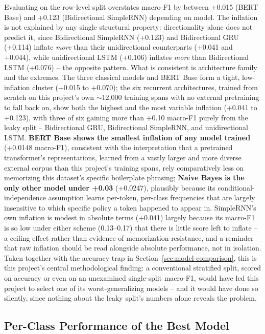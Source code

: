 \documentclass[11pt]{acl}
\begin{document}
Evaluating on the row-level split overstates macro-F1 by between +0.015 (BERT Base) and
+0.123 (Bidirectional SimpleRNN) depending on model. The inflation is not explained by
any single structural property: directionality alone does not predict it, since
Bidirectional SimpleRNN (+0.123) and Bidirectional GRU (+0.114) inflate \emph{more} than
their unidirectional counterparts (+0.041 and +0.044), while unidirectional LSTM
(+0.106) inflates \emph{more} than Bidirectional LSTM (+0.076) -- the opposite pattern.
What is consistent is architecture family and the extremes. The three classical models
and BERT Base form a tight, low-inflation cluster (+0.015 to +0.070); the six recurrent
architectures, trained from scratch on this project's own ${\sim}$12,000 training spans
with no external pretraining to fall back on, show both the highest and the most
variable inflation (+0.041 to +0.123), with three of six gaining more than +0.10
macro-F1 purely from the leaky split -- Bidirectional GRU, Bidirectional SimpleRNN, and
unidirectional LSTM. \textbf{BERT Base shows the smallest inflation of any model
trained} (+0.0148 macro-F1), consistent with the interpretation that a pretrained
transformer's representations, learned from a vastly larger and more diverse external
corpus than this project's training spans, rely comparatively less on memorizing this
dataset's specific boilerplate phrasing; \textbf{Naive Bayes is the only other model
under +0.03} (+0.0247), plausibly because its conditional-independence assumption
learns per-token, per-class frequencies that are largely insensitive to which specific
policy a token happened to appear in. SimpleRNN's own inflation is modest in absolute
terms (+0.041) largely because its macro-F1 is so low under either scheme (0.13--0.17)
that there is little score left to inflate -- a ceiling effect rather than evidence of
memorization-resistance, and a reminder that raw inflation should be read alongside
absolute performance, not in isolation. Taken together with the accuracy trap in
Section~\ref{sec:model-comparison}, this is this project's central methodological
finding: a conventional stratified split, scored on accuracy or even on an unexamined
single-split macro-F1, would have led this project to select one of its
worst-generalizing models -- and it would have done so silently, since nothing about
the leaky split's numbers alone reveals the problem.

\subsection{Per-Class Performance of the Best Model}
\label{sec:per-class}
\end{document}
